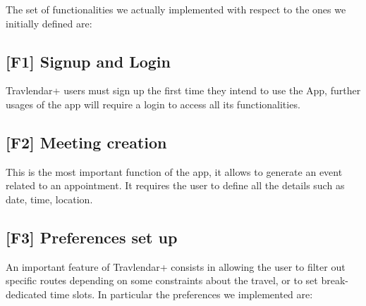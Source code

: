 The set of functionalities we actually implemented with respect to the ones we initially defined are:

\subsection{[F1] Signup and Login}
Travlendar+ users must sign up the first time they intend to use the App, further usages of the app will require a login to access all its functionalities.

\subsection{[F2] Meeting creation}
This is the most important function of the app, it allows to generate an event related to an appointment. It requires the user to define all the details such as date, time, location.

\subsection{[F3] Preferences set up}
An important feature of Travlendar+ consists in allowing the user to filter out specific routes depending on some constraints about the travel, or to set break-dedicated time slots. In particular the preferences we implemented are:

